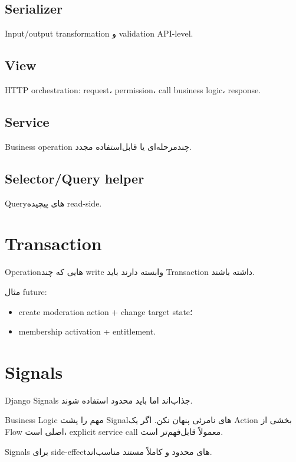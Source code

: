 \subsection{Serializer}

Input/output transformation و validation API-level.

\subsection{View}

HTTP orchestration: request، permission، call business logic، response.

\subsection{Service}

Business operation چندمرحله‌ای یا قابل‌استفاده مجدد.

\subsection{Selector/Query helper}

Queryهای پیچیده read-side.

\section{Transaction}

Operationهایی که چند write وابسته دارند باید Transaction داشته باشند.

مثال future:
\begin{itemize}
  \item create moderation action + change target state؛
  \item membership activation + entitlement.
\end{itemize}

\section{Signals}

Django Signals جذاب‌اند اما باید محدود استفاده شوند.

\begin{warningbox}
Business Logic مهم را پشت Signalهای نامرئی پنهان نکن. اگر یک Action بخشی از Flow اصلی است، explicit service call معمولاً قابل‌فهم‌تر است.
\end{warningbox}

Signals برای side-effectهای محدود و کاملاً مستند مناسب‌اند.

